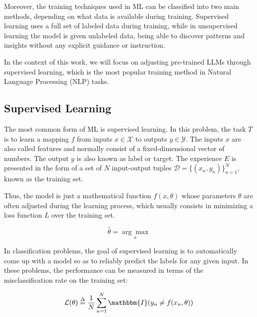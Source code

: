 \documentclass[11pt,english,listoffigures,listoftables]{tfgetsinf}
\begin{document}
Moreover, the training techniques used in ML can be classified into two main methods, depending on what data is available during training. Supervised learning uses a full set of labeled data during training, while in unsupervised learning the model is given unlabeled data, being able to discover patterns and insights without any explicit guidance or instruction.

In the context of this work, we will focus on adjusting pre-trained LLMs through supervised learning, which is the most popular training method in Natural Language Processing (NLP) tasks.

\subsection{Supervised Learning}

The most common form of ML is supervised learning. In this problem, the task \( T \) is to learn a mapping \( f \) from inputs $x \in \mathcal{X}$ to outputs $y \in \mathcal{Y}$. The inputs \( x \) are also called features and normally consist of a fixed-dimensional vector of numbers. The output \( y \) is also known as label or target. The experience \( E \) is presented in the form of a set of \( N \) input-output tuples $\mathcal{D}=\{( x_{n},y_{n} )\}_{n=1}^N$, known as the training set.

Thus, the model is just a mathematical function $f(x,\theta)$ whose parameters \( \theta \) are often adjusted during the learning process, which usually consists in minimizing a loss function  \( L \) over the training set. 

\begin{equation}
\hat\theta=\underset{x}{\arg\max}
\end{equation}

In classification problems, the goal of supervised learning is to automatically come up with a model so as to reliably predict the labels for any given input. In these problems, the performance can be measured in terms of the misclassification rate on the training set:

\begin{equation}
\mathcal{L}(\theta)\overset{\Delta}{=}\frac{1}{N}\sum_{n=1}^{N}\mathbbm{I}(y_n\neq f(x_n,\theta))
\end{equation}
\end{document}
